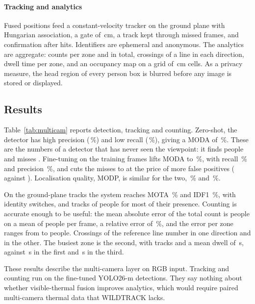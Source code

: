\paragraph{Tracking and analytics}
Fused positions feed a constant-velocity tracker on the ground plane with Hungarian association, a gate of \cfgTrackGate{}\,cm, a track kept through \cfgTrackMiss{} missed frames, and confirmation after \cfgTrackHits{} hits. Identifiers are ephemeral and anonymous. The analytics are aggregate: counts per zone and in total, crossings of a line in each direction, dwell time per zone, and an occupancy map on a grid of \cfgGroundCell{}\,cm cells. As a privacy measure, the head region of every person box is blurred before any image is stored or displayed.

\subsection{Results}
Table~\ref{tab:multicam} reports detection, tracking and counting. Zero-shot, the detector has high precision (\camDetZeroShotPrecision{}\,\%) and low recall (\camDetZeroShotRecall{}\,\%), giving a MODA of \camDetZeroShotModa{}\,\%. These are the numbers of a detector that has never seen the viewpoint: it finds \camDetZeroShotTp{} people and misses \camDetZeroShotFn{}. Fine-tuning on the training frames lifts MODA to \camDetFineTunedModa{}\,\%, with recall \camDetFineTunedRecall{}\,\% and precision \camDetFineTunedPrecision{}\,\%, and cuts the misses to \camDetFineTunedFn{} at the price of more false positives (\camDetFineTunedFp{} against \camDetZeroShotFp{}). Localisation quality, MODP, is similar for the two, \camDetZeroShotModp{}\,\% and \camDetFineTunedModp{}\,\%.

On the ground-plane tracks the system reaches MOTA \camTrackMota{}\,\% and IDF1 \camTrackIdfOne{}\,\%, with \camTrackSwitches{} identity switches, and tracks \camTrackMostlyTracked{} of \camTrackUniqueObjects{} people for most of their presence. Counting is accurate enough to be useful: the mean absolute error of the total count is \camCountMae{} people on a mean of \camCountMeanPeople{} people per frame, a relative error of \camCountRelErr{}\,\%, and the error per zone ranges from \camCountZoneThreeMae{} to \camCountZoneTwoMae{} people. Crossings of the reference line number \camCrossBackward{} in one direction and \camCrossForward{} in the other. The busiest zone is the second, with \camDwellZoneTwoTracks{} tracks and a mean dwell of \camDwellZoneTwoMeanS{}\,s, against \camDwellZoneOneMeanS{}\,s in the first and \camDwellZoneThreeMeanS{}\,s in the third.

These results describe the multi-camera layer on RGB input. Tracking and counting run on the fine-tuned YOLO26-m detections. They say nothing about whether visible-thermal fusion improves analytics, which would require paired multi-camera thermal data that WILDTRACK lacks.


